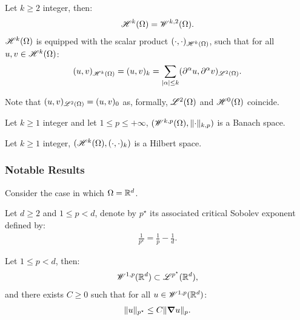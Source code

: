 \begin{definition}
    Let $k \geq 2$ integer, then:
    \begin{align}
        \mathscr{H}^{k}(\Omega) = \mathscr{W}^{k, 2}(\Omega).
    \end{align}
    $\mathscr{H}^{k}(\Omega)$ is equipped with the scalar product $(\cdot, \cdot)_{\mathscr{H}^{k}(\Omega)}$, such that for all $u, v \in \mathscr{H}^{k}(\Omega)$:
    \begin{align}
        (u, v)_{\mathscr{H}^{k}(\Omega)} = (u, v)_k = \sum_{\lvert \alpha \rvert \leq k} (\partial^{\alpha} u, \partial^{\alpha} v)_{\mathscr{L}^{2}(\Omega)}.
    \end{align}
\end{definition}

Note that $(u, v)_{\mathscr{L}^{2}(\Omega)} = (u, v)_0$ as, formally, $\mathscr{L}^{2}(\Omega)$ and $\mathscr{H}^{0}(\Omega)$ coincide. %

\begin{remark}
    Let $k \geq 1$ integer and let $1 \leq p \leq +\infty$, $(\mathscr{W}^{k, p}(\Omega), \lVert \cdot \rVert_{k, p})$ is a Banach space.
\end{remark}

\begin{remark}
    Let $k \geq 1$ integer, $(\mathscr{H}^{k}(\Omega), (\cdot, \cdot)_k)$ is a Hilbert space.
\end{remark}

\newpage
\subsubsection{Notable Results}

Consider the case in which $\Omega = \mathbb{R}^{d}$.

\begin{definition}
    Let $d \geq 2$ and $1 \leq p < d$, denote by $p^{\star}$ its associated critical Sobolev exponent defined by:
    \begin{align}
        \frac{1}{p^{\star}} = \frac{1}{p} - \frac{1}{d}.
    \end{align}
\end{definition}

\begin{theorem}
    Let $1 \leq p < d$, then:
    \begin{align}
        \mathscr{W}^{1, p}(\mathbb{R}^{d}) \subset \mathscr{L}^{p^{\star}}(\mathbb{R}^{d}),
    \end{align}
    and there exists $C \geq 0$ such that for all $u \in \mathscr{W}^{1, p}(\mathbb{R}^{d})$:
    \begin{align}
        \lVert u \rVert_{p^{\star}} \leq C \lVert \bm{\nabla} u \rVert_p.
    \end{align}
\end{theorem}

